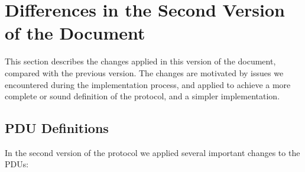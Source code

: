 \section{Differences in the Second Version of the Document}
\label{sec:diff}

This section describes the changes applied in this version of the document, compared with the previous version. The changes are motivated by issues we encountered during the implementation process, and applied to achieve a more complete or sound definition of the protocol, and a simpler implementation.

\subsection{PDU Definitions}
In the second version of the protocol we applied several important changes to the PDUs:
